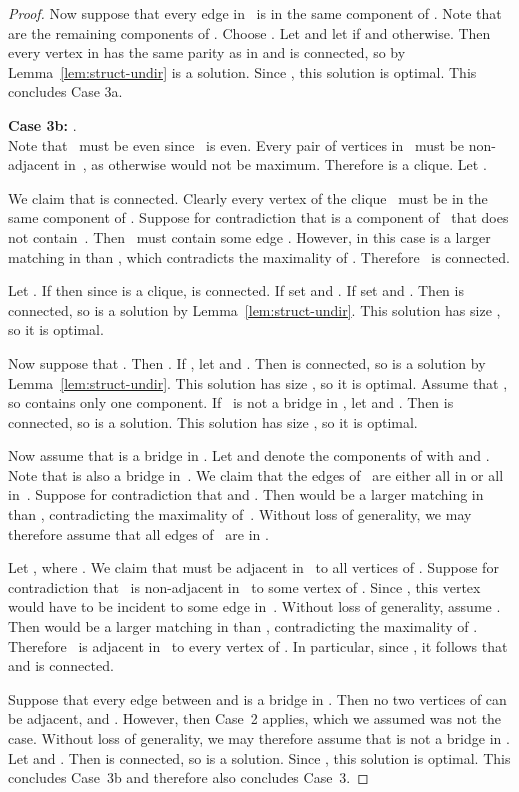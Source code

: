 \documentclass[11pt]{llncs}
\newcommand\displaycase[1]{{\bf #1}}
\begin{document}
\begin{proof}
Now suppose that every edge in~ is in the same component of . Note that
 are the remaining components of .  Choose . Let
 and let  if  and  otherwise.  Then every vertex in
 has the same parity as in  and  is connected, so by
Lemma~\ref{lem:struct-undir}  is a solution. Since
, this solution is optimal.
This concludes Case 3a.

\medskip
\noindent
\displaycase{Case 3b:} .\\
Note that~ must be even since~ is even. Every pair of vertices
in~ must be non-adjacent in~, as otherwise  would not be
maximum. Therefore  is a
clique. Let .

We claim that  is connected. Clearly every vertex of the clique~
must be in the same component of . Suppose for contradiction that 
is a component of~ that does not contain~. Then~ must contain
some edge . However, in this case  is a larger matching in  than ,
which contradicts the maximality of . Therefore~ is connected.

Let . If  then since  is a
clique,  is connected. If  set  and . If 
set  and . Then  is connected, so  is a solution by
Lemma~\ref{lem:struct-undir}. This solution has size ,
so it is optimal.

Now suppose that . Then . If , let  and . Then  is connected, so
 is a solution by Lemma~\ref{lem:struct-undir}. This solution has size
, so it is optimal.
Assume that , so  contains only one component. If~ is
not a bridge in , let  and . Then  is connected,
so  is a solution. This solution has size , so
it is optimal.

Now assume that  is a bridge in . Let  and  denote
the components of  with  and . Note
that  is also a bridge in~.  We claim that the edges of~ are
either all in  or all in~. Suppose for contradiction that  and . Then  would be a larger matching in~ than
, contradicting the maximality of~.  Without loss of generality, we may
therefore assume that all edges of~ are in .

Let , where .  We claim that
 must be adjacent in~ to all vertices of . Suppose
for contradiction that~ is non-adjacent in~ to some vertex of . Since , this vertex would have to be
incident to some edge in~. Without loss of generality, assume . Then  would be a larger
matching in  than , contradicting the maximality of .
Therefore~ is adjacent in~ to every vertex of . In
particular, since , it follows that  and  is connected.

Suppose that every edge between  and  is a bridge in
. Then no two vertices of  can be adjacent, and
. However, then Case~2 applies, which we assumed was not the
case. Without loss of generality, we may therefore assume that  is not
a bridge in . Let  and .
Then  is connected, so  is a solution. Since
, this solution is optimal.
This concludes Case~3b and therefore also concludes Case~3.


\end{proof}
\end{document}
